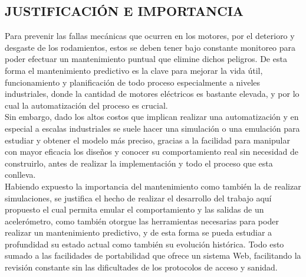 
\subsection{JUSTIFICACIÓN E IMPORTANCIA}

Para prevenir las fallas mecánicas que ocurren en los motores, por el deterioro y desgaste de los rodamientos, estos se deben tener bajo constante monitoreo para poder efectuar un mantenimiento puntual que elimine dichos peligros. De esta forma el mantenimiento predictivo es la clave para mejorar la vida útil, funcionamiento y planificación de todo proceso especialmente a niveles industriales, donde la cantidad de motores eléctricos es bastante elevada, y por lo cual la automatización del proceso es crucial.\\


Sin embargo, dado los altos costos que implican realizar una automatización y en especial a escalas industriales se suele hacer una simulación o una emulación para estudiar y obtener el modelo más preciso, gracias a la facilidad para manipular con mayor eficacia los diseños y conocer su comportamiento real sin necesidad de construirlo, antes de realizar la implementación y todo el proceso que esta conlleva.\\


Habiendo expuesto la importancia del mantenimiento como también la de realizar simulaciones, se justifica el hecho de realizar el desarrollo del trabajo aquí propuesto el cual permita emular el comportamiento y las salidas de un acelerómetro, como también otorgue las herramientas necesarias para poder realizar un mantenimiento predictivo, y de esta forma se pueda estudiar a profundidad su estado actual como también su evolución histórica. Todo esto sumado a las facilidades de portabilidad que ofrece un sistema Web, facilitando la revisión constante sin las dificultades de los protocolos de acceso y sanidad.\\